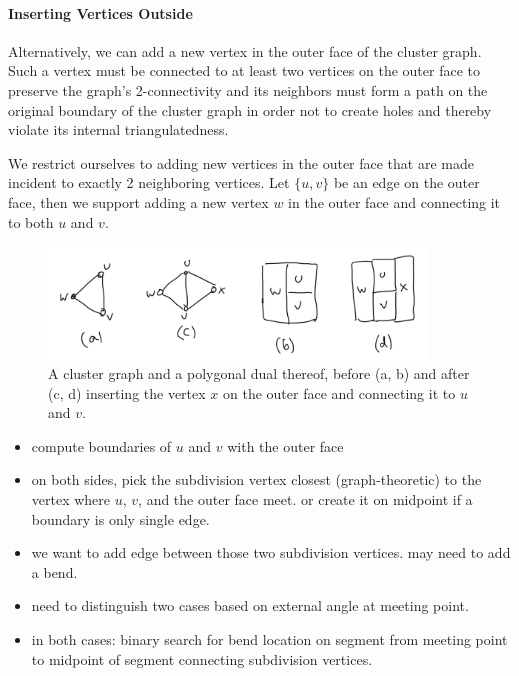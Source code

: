 \paragraph{Inserting Vertices Outside}

Alternatively, we can add a new vertex in the outer face of the cluster graph. Such a vertex must be connected to at least two vertices on the outer face to preserve the graph's 2-connectivity and its neighbors must form a path on the original boundary of the cluster graph in order not to create holes and thereby violate its internal triangulatedness.

We restrict ourselves to adding new vertices in the outer face that are made incident to exactly 2 neighboring vertices. Let $\{u,v\}$ be an edge on the outer face, then we support adding a new vertex $w$ in the outer face and connecting it to both $u$ and $v$.

\begin{figure}[H]
	\centering
	\includegraphics[height=30mm]{Resources/InsertVertexOutside.png}
	\caption{A cluster graph and a polygonal dual thereof, before (a, b) and after (c, d) inserting the vertex $x$ on the outer face and connecting it to $u$ and $v$.}
	\label{fig:insert-vertex-outside-example}
\end{figure}

\begin{itemize}
	\item compute boundaries of $u$ and $v$ with the outer face
	\item on both sides, pick the subdivision vertex closest (graph-theoretic) to the vertex where $u$, $v$, and the outer face meet. or create it on midpoint if a boundary is only single edge.
	\item we want to add edge between those two subdivision vertices. may need to add a bend.
	\item need to distinguish two cases based on external angle at meeting point.
	\item in both cases: binary search for bend location on segment from meeting point to midpoint of segment connecting subdivision vertices.
\end{itemize}
